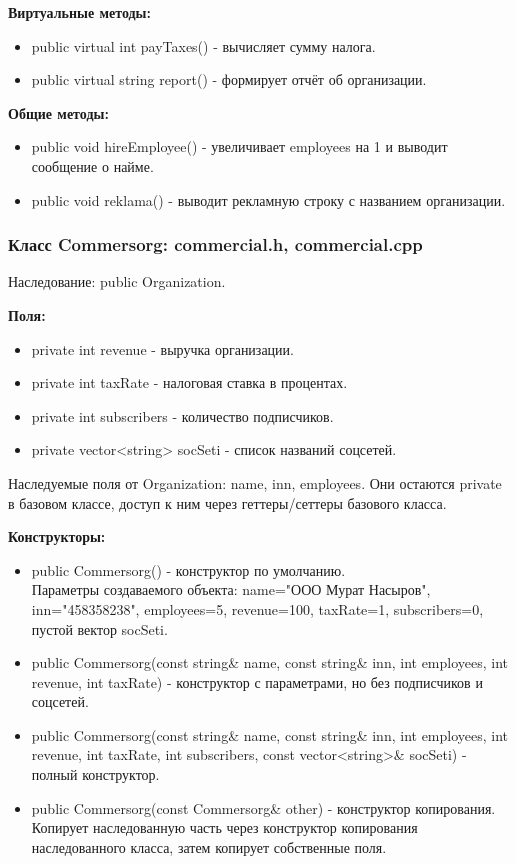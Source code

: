 \documentclass[oneside,a4paper,14pt]{extarticle}
\begin{document}
    \textbf{Виртуальные методы:}
    \begin{itemize}
        \item public virtual int payTaxes() - вычисляет сумму налога.
        \item public virtual string report() - формирует отчёт об организации.
    \end{itemize}

    \textbf{Общие методы:}
    \begin{itemize}
        \item public void hireEmployee() - увеличивает employees на 1 и выводит сообщение о найме.
        \item public void reklama() - выводит рекламную строку с названием организации.
    \end{itemize}

    \newpage

    \subsubsection*{Класс Commersorg: commercial.h, commercial.cpp}

    Наследование: public Organization.

    \textbf{Поля:}
    \begin{itemize}
        \item private int revenue - выручка организации.
        \item private int taxRate - налоговая ставка в процентах.
        \item private int subscribers - количество подписчиков.
        \item private vector<string> socSeti - список названий соцсетей.
    \end{itemize}

    Наследуемые поля от Organization: name, inn, employees. Они остаются private в базовом классе, доступ к ним через геттеры/сеттеры базового класса.

    \textbf{Конструкторы:}
    \begin{itemize}
        \item public Commersorg() - конструктор по умолчанию.\\ Параметры создаваемого объекта: name="ООО Мурат Насыров", inn="458358238", employees=5, revenue=100, taxRate=1, subscribers=0, пустой вектор socSeti.
        \item public Commersorg(const string\& name, const string\& inn, int employees, int revenue, int taxRate) - конструктор с параметрами, но без подписчиков и соцсетей.
        \item public Commersorg(const string\& name, const string\& inn, int employees, int revenue, int taxRate, int subscribers, const vector<string>\& socSeti) - полный конструктор.
        \item public Commersorg(const Commersorg\& other) - конструктор копирования.\\Копирует наследованную часть через конструктор копирования наследованного класса, затем копирует собственные поля.
    \end{itemize}
\end{document}
